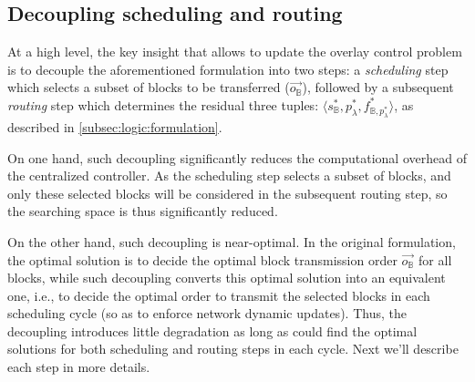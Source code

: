 

\subsection{Decoupling scheduling and routing}
\label{subsec:logic:separation}

At a high level, the key insight that allows \name to update the overlay control problem is
to decouple the aforementioned formulation into two steps:
a {\em scheduling} step which selects a subset of blocks to be transferred
($\overrightarrow{o_\mathbb{B}}$), followed by a subsequent {\em routing}
step which determines the residual three tuples: $\langle s_{\mathbb{B}}^*, p_{\lambda}^*, f^*_{\mathbb{B},p_{\lambda}^*} \rangle$, as described in \Section\ref{subsec:logic:formulation}. %

On one hand, such decoupling significantly reduces the computational overhead of the centralized controller. As the scheduling step selects a subset of blocks, and only these selected blocks will be considered in the subsequent routing step, so the searching space is thus significantly reduced.

On the other hand, such decoupling is near-optimal. In the original formulation, the optimal solution is to decide the optimal block transmission order $\overrightarrow{o_\mathbb{B}}$ for all blocks, while such decoupling converts this optimal solution into an equivalent one, i.e., to decide the optimal order to transmit the selected blocks in each scheduling cycle (so as to enforce network dynamic updates). Thus, the decoupling introduces little degradation as long as \name could find the optimal solutions for both scheduling and routing steps in each cycle. Next we'll describe each step in more details.

